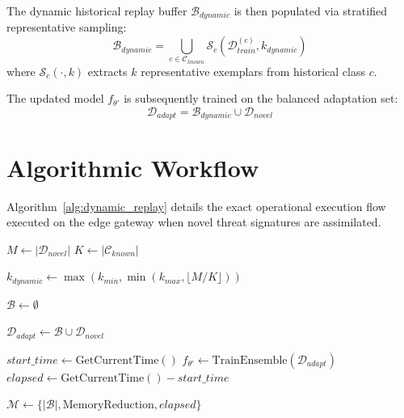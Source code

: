 The dynamic historical replay buffer $\mathcal{B}_{dynamic}$ is then populated via stratified representative sampling:
\begin{equation}
\mathcal{B}_{dynamic} = \bigcup_{c \in \mathcal{C}_{known}} \mathcal{S}_{c}\left(\mathcal{D}_{train}^{(c)}, k_{dynamic}\right)
\end{equation}
where $\mathcal{S}_{c}(\cdot, k)$ extracts $k$ representative exemplars from historical class $c$.

The updated model $f_{\theta'}$ is subsequently trained on the balanced adaptation set:
\begin{equation}
\mathcal{D}_{adapt} = \mathcal{B}_{dynamic} \cup \mathcal{D}_{novel}
\end{equation}

\section{Algorithmic Workflow}

Algorithm~\ref{alg:dynamic_replay} details the exact operational execution flow executed on the edge gateway when novel threat signatures are assimilated.

\begin{algorithm}[H]
\caption{Dynamic Continual Learning Adaptation for IoT NIDS}
\label{alg:dynamic_replay}

$M \leftarrow |\mathcal{D}_{novel}|$\;
$K \leftarrow |\mathcal{C}_{known}|$\;

$k_{dynamic} \leftarrow \max\left( k_{min}, \min\left( k_{max}, \lfloor M / K \rfloor \right) \right)$\;

$\mathcal{B} \leftarrow \emptyset$\;

$\mathcal{D}_{adapt} \leftarrow \mathcal{B} \cup \mathcal{D}_{novel}$\;

$start\_time \leftarrow \text{GetCurrentTime}()$\;
$f_{\theta'} \leftarrow \text{TrainEnsemble}(\mathcal{D}_{adapt})$\;
$elapsed \leftarrow \text{GetCurrentTime}() - start\_time$\;

$\mathcal{M} \leftarrow \{|\mathcal{B}|, \text{MemoryReduction}, elapsed\}$\;
\end{algorithm}

